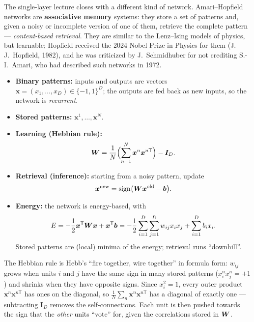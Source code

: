 \documentclass[11pt, oneside]{book}
\newcommand{\T}{^{\mathsf{T}}}           %
\DeclareMathOperator{\sign}{sign}
\newcommand{\bx}{\bm{x}}        \newcommand{\by}{\bm{y}}
\newcommand{\bb}{\bm{b}}        \newcommand{\bh}{\bm{h}}
\newcommand{\bI}{\bm{I}}        \newcommand{\bJ}{\bm{J}}
\begin{document}
The single-layer lecture closes with a different kind of network.
Amari--Hopfield networks are \textbf{associative memory} systems: they store
a set of patterns and, given a noisy or incomplete version of one of them,
retrieve the complete pattern --- \emph{content-based retrieval}. They are
similar to the Lenz--Ising models of physics, but learnable; Hopfield
received the 2024 Nobel Prize in Physics for them (J.\,J.~Hopfield, 1982),
and he was criticized by J.~Schmidhuber for not crediting S.-I.~Amari, who
had described such networks in 1972.

\begin{defbox}[title={Amari--Hopfield network}]
\begin{itemize}
  \item \textbf{Binary patterns:} inputs and outputs are vectors
    $\bx = (x_1, \dots, x_D) \in \{-1, 1\}^D$; the outputs are fed back as
    new inputs, so the network is \emph{recurrent}.
  \item \textbf{Stored patterns:} $\bx^1, \dots, \bx^N$.
  \item \textbf{Learning (Hebbian rule):}
    \[
      \bW = \frac1N\Bigl(\sum_{n=1}^{N}\bx^n\bx^{n\mathsf{T}}\Bigr) - \bI_D .
    \]
  \item \textbf{Retrieval (inference):} starting from a noisy pattern,
    update
    \[
      \bx^{\text{new}} = \sign\bigl(\bW\bx^{\text{old}} - \bb\bigr).
    \]
  \item \textbf{Energy:} the network is energy-based, with
    \[
      E = -\frac12\bx\T\bW\bx + \bx\T\bb
        = -\frac12\sum_{i=1}^{D}\sum_{j=1}^{D} w_{ij}x_i x_j + \sum_{i=1}^{D} b_i x_i .
    \]
    Stored patterns are (local) minima of the energy; retrieval runs
    ``downhill''.
\end{itemize}
\end{defbox}

\begin{intbox}
The Hebbian rule is Hebb's ``fire together, wire together'' in formula
form: $w_{ij}$ grows when units $i$ and $j$ have the same sign in many stored
patterns ($x^n_i x^n_j = +1$) and shrinks when they have opposite signs.
Since $x_i^2 = 1$, every outer product $\bx^n\bx^{n\mathsf{T}}$ has ones on
the diagonal, so $\frac1N\sum_n\bx^n\bx^{n\mathsf{T}}$ has a diagonal of
exactly one --- subtracting $\bI_D$ removes the self-connections. Each unit
is then pushed towards the sign that the \emph{other} units ``vote'' for,
given the correlations stored in $\bm{W}$.
\end{intbox}
\end{document}
